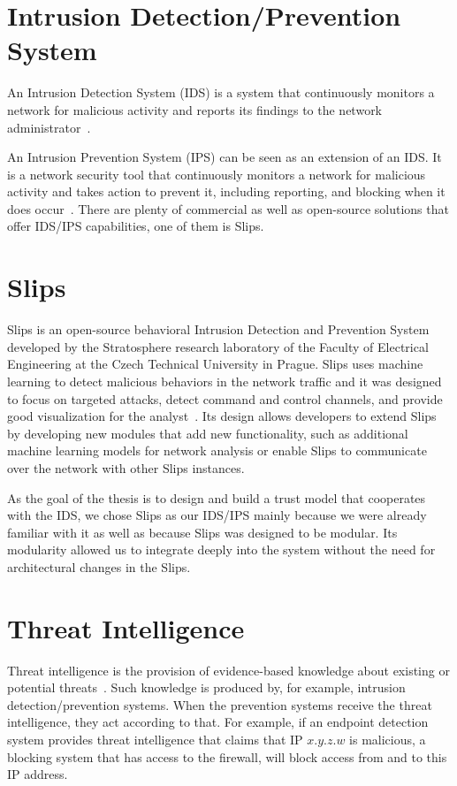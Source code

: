 \section{Intrusion Detection/Prevention System}
\label{sec:intrusion-detection-prevention-system}
An Intrusion Detection System (IDS) is a system that continuously monitors a network for malicious activity and reports its findings to the network administrator~\cite{barracuda}.

An Intrusion Prevention System (IPS) can be seen as an extension of an IDS. 
It is a network security tool that continuously monitors a network for malicious activity and takes action to prevent it, including reporting, and blocking when it does occur~\cite{vmware}.
There are plenty of commercial as well as open-source solutions that offer IDS/IPS capabilities, one of them is Slips.


\section{Slips}
\label{sec:slips}
Slips is an open-source behavioral Intrusion Detection and Prevention System developed by the Stratosphere research laboratory of the Faculty of Electrical Engineering at the Czech Technical University in Prague.
Slips uses machine learning to detect malicious behaviors in the network traffic and it was designed to focus on targeted attacks, detect command and control channels, and provide good visualization for the analyst~\cite{slips}.
Its design allows developers to extend Slips by developing new modules that add new functionality, such as additional machine learning models for network analysis or enable Slips to communicate over the network with other Slips instances.

As the goal of the thesis is to design and build a trust model that cooperates with the IDS, we chose Slips as our IDS/IPS mainly because we were already familiar with it as well as because Slips was designed to be modular.
Its modularity allowed us to integrate deeply into the system without the need for architectural changes in the Slips.

\section{Threat Intelligence}
\label{sec:threat-intelligence}
Threat intelligence is the provision of evidence-based knowledge about existing or potential threats~\cite{threatintelligence}.
Such knowledge is produced by, for example, intrusion 
detection/prevention systems.
When the prevention systems receive the threat intelligence, they act according to that.
For example, if an endpoint detection system provides threat intelligence that claims that IP $x.y.z.w$ is malicious, a blocking system that has access to the firewall, will block access from and to this IP address.

